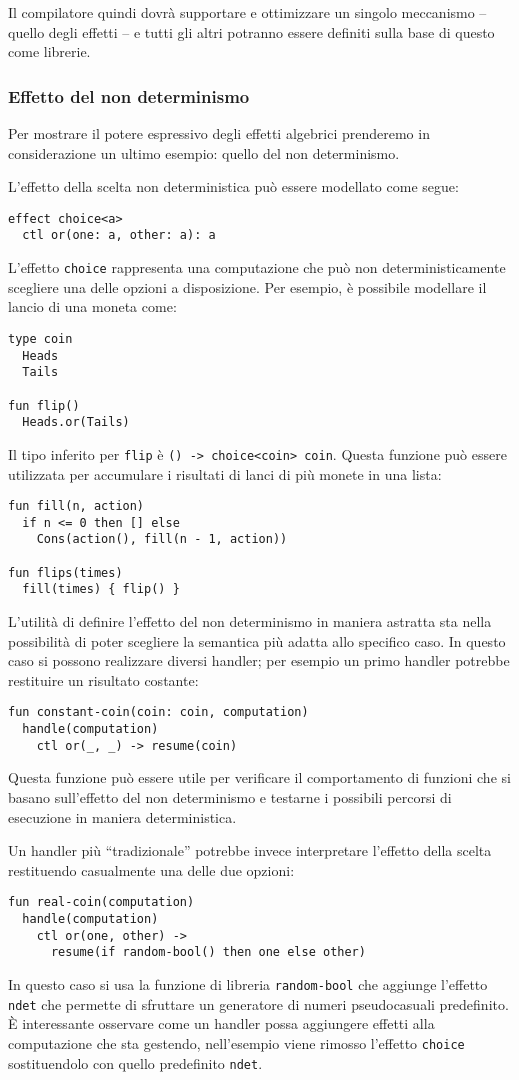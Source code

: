 Il compilatore quindi dovrà supportare e ottimizzare un singolo meccanismo -- quello degli effetti -- e tutti gli altri potranno essere definiti sulla base di questo come librerie.

\subsubsection{Effetto del non determinismo}
Per mostrare il potere espressivo degli effetti algebrici prenderemo in considerazione un ultimo esempio: quello del non determinismo.

L'effetto della scelta non deterministica può essere modellato come segue:
\begin{lstlisting}[language=koka]
effect choice<a>
  ctl or(one: a, other: a): a
\end{lstlisting}
L'effetto \lstinline{choice} rappresenta una computazione che può non deterministicamente scegliere una delle opzioni a disposizione.
Per esempio, è possibile modellare il lancio di una moneta come:
\begin{lstlisting}[language=koka]
type coin
  Heads
  Tails

fun flip()
  Heads.or(Tails)
\end{lstlisting}
Il tipo inferito per \lstinline{flip} è \lstinline{() -> choice<coin> coin}. Questa funzione può essere utilizzata per accumulare i risultati di lanci di più monete in una lista:
\begin{lstlisting}[language=koka]
fun fill(n, action)
  if n <= 0 then [] else
    Cons(action(), fill(n - 1, action))

fun flips(times)
  fill(times) { flip() }
\end{lstlisting}
L'utilità di definire l'effetto del non determinismo in maniera astratta sta nella possibilità di poter scegliere la semantica più adatta allo specifico caso. In questo caso si possono realizzare diversi handler; per esempio un primo handler potrebbe restituire un risultato costante:
\begin{lstlisting}[language=koka]
fun constant-coin(coin: coin, computation)
  handle(computation)
    ctl or(_, _) -> resume(coin)
\end{lstlisting}
Questa funzione può essere utile per verificare il comportamento di funzioni che si basano sull'effetto del non determinismo e testarne i possibili percorsi di esecuzione in maniera deterministica.

Un handler più ``tradizionale'' potrebbe invece interpretare l'effetto della scelta restituendo casualmente una delle due opzioni:
\begin{lstlisting}[language=koka]
fun real-coin(computation)
  handle(computation)
    ctl or(one, other) ->
      resume(if random-bool() then one else other)
\end{lstlisting}
In questo caso si usa la funzione di libreria \lstinline{random-bool} che aggiunge l'effetto \lstinline{ndet} che permette di sfruttare un generatore di numeri pseudocasuali predefinito. È interessante osservare come un handler possa aggiungere effetti alla computazione che sta gestendo, nell'esempio viene rimosso l'effetto \lstinline{choice} sostituendolo con quello predefinito \lstinline{ndet}.

